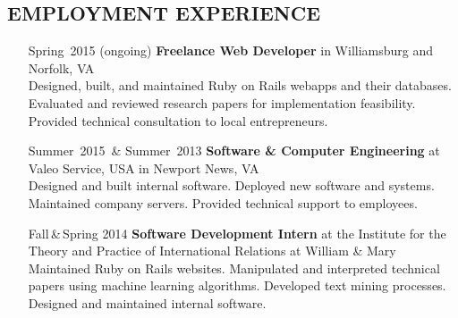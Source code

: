 \documentclass{res}     %
\begin{document}
\begin{resume}
\section{EMPLOYMENT EXPERIENCE}
\vspace{5mm}
\begin{itemize}[font=\itshape,align=parleft,labelwidth=3cm,leftmargin=2cm]
    \item[Spring~2015 (ongoing)]
        \textbf{Freelance Web Developer}
        in Williamsburg and Norfolk, VA
        \vspace{1mm} \\
        Designed, built, and maintained Ruby on Rails webapps and their databases.
        Evaluated and reviewed research papers for implementation feasibility.
        Provided technical consultation to local entrepreneurs.
    \item[Summer~2015~\& Summer~2013]
        \textbf{Software \& Computer Engineering}
        at Valeo Service, USA
        in Newport News, VA
        \vspace{1mm} \\
        Designed and built internal software.
        Deployed new software and systems.
        Maintained company servers.
        Provided technical support to employees.
    \item[Fall\,\&\,Spring 2014]
        \textbf{Software Development Intern}
        at the Institute for the Theory and Practice of International Relations
        at William \& Mary
        \vspace{1mm} \\
        Maintained Ruby on Rails websites.
        Manipulated and interpreted technical papers using machine learning algorithms.
        Developed text mining processes.
        Designed and maintained internal software.
\end{itemize}


\end{resume}
\end{document}
